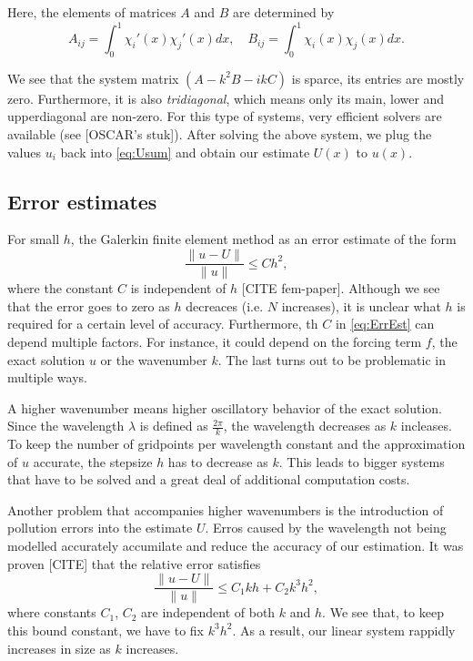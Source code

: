 \documentclass[a4paper]{article}
\begin{document}
Here, the elements of matrices $A$ and $B$ are determined by
\begin{equation}
  A_{i j} = \int^1_0 \chi_i'(x) \chi_j'(x) dx, \quad
  B_{i j} = \int^1_0 \chi_i(x) \chi_j(x) dx.
\end{equation}

We see that the system matrix $(A - k^2 B - i k C)$ is sparce, its
entries are mostly zero. Furthermore, it is also \emph{tridiagonal},
which means only its main, lower and upperdiagonal are non-zero. For
this type of systems, very efficient solvers are available (see
[OSCAR's stuk]). After solving the above system, we plug the values
$u_i$ back into \eqref{eq:Usum} and obtain our estimate $U(x)$ to
$u(x)$.

\subsection{Error estimates}

For small $h$, the Galerkin finite element method as an error estimate
of the form
\begin{equation} \label{eq:ErrEst}
  \frac{\lVert u - U \rVert}{\lVert u \rVert} \leq C h^2,
\end{equation}
where the constant $C$ is independent of $h$ \cite{}[CITE fem-paper].
Although we see that the error goes to zero as $h$ decreaces (i.e. $N$
increases), it is unclear what $h$ is required for a certain level of
accuracy. Furthermore, th $C$ in \eqref{eq:ErrEst} can depend multiple
factors. For instance, it could depend on the forcing term $f$, the
exact solution $u$ or the wavenumber $k$. The last turns out to be
problematic in multiple ways.

A higher wavenumber means higher oscillatory behavior of the exact
solution. Since the wavelength $\lambda$ is defined as
$\frac{2\pi}{k}$, the wavelength decreases as $k$ incleases. To keep
the number of gridpoints per wavelength constant and the approximation
of $u$ accurate, the stepsize $h$ has to decrease as $k$. This leads
to bigger systems that have to be solved and a great deal of
additional computation costs.

Another problem that accompanies higher wavenumbers is the
introduction of pollution errors into the estimate $U$. Erros caused
by the wavelength not being modelled accurately accumilate and reduce
the accuracy of our estimation. It was proven [CITE] that the relative error
satisfies
\begin{equation} \label{eq:ErrEstK}
  \frac{\lVert u - U \rVert}{\lVert u \rVert} \leq C_1 k h + C_2 k^3
  h^2,
\end{equation}
where constants $C_1$, $C_2$ are independent of both $k$ and $h$. We
see that, to keep this bound constant, we have to fix $k^3 h^2$. As a
result, our linear system rappidly increases in size as $k$ increases.
\end{document}
